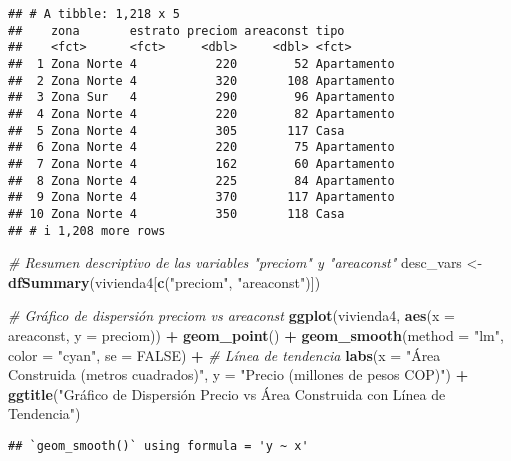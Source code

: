 \documentclass[
]{article}
\newenvironment{Shaded}{\begin{snugshade}}{\end{snugshade}}
\newcommand{\AttributeTok}[1]{\textcolor[rgb]{0.13,0.29,0.53}{#1}}
\newcommand{\CommentTok}[1]{\textcolor[rgb]{0.56,0.35,0.01}{\textit{#1}}}
\newcommand{\ConstantTok}[1]{\textcolor[rgb]{0.56,0.35,0.01}{#1}}
\newcommand{\FunctionTok}[1]{\textcolor[rgb]{0.13,0.29,0.53}{\textbf{#1}}}
\newcommand{\NormalTok}[1]{#1}
\newcommand{\OtherTok}[1]{\textcolor[rgb]{0.56,0.35,0.01}{#1}}
\newcommand{\SpecialCharTok}[1]{\textcolor[rgb]{0.81,0.36,0.00}{\textbf{#1}}}
\newcommand{\StringTok}[1]{\textcolor[rgb]{0.31,0.60,0.02}{#1}}
\begin{document}
\begin{verbatim}
## # A tibble: 1,218 x 5
##    zona       estrato preciom areaconst tipo       
##    <fct>      <fct>     <dbl>     <dbl> <fct>      
##  1 Zona Norte 4           220        52 Apartamento
##  2 Zona Norte 4           320       108 Apartamento
##  3 Zona Sur   4           290        96 Apartamento
##  4 Zona Norte 4           220        82 Apartamento
##  5 Zona Norte 4           305       117 Casa       
##  6 Zona Norte 4           220        75 Apartamento
##  7 Zona Norte 4           162        60 Apartamento
##  8 Zona Norte 4           225        84 Apartamento
##  9 Zona Norte 4           370       117 Apartamento
## 10 Zona Norte 4           350       118 Casa       
## # i 1,208 more rows
\end{verbatim}

\begin{Shaded}
\begin{Highlighting}[]
\CommentTok{\# Resumen descriptivo de las variables "preciom" y "areaconst"}
\NormalTok{desc\_vars }\OtherTok{\textless{}{-}} \FunctionTok{dfSummary}\NormalTok{(vivienda4[}\FunctionTok{c}\NormalTok{(}\StringTok{"preciom"}\NormalTok{, }\StringTok{"areaconst"}\NormalTok{)])}
\end{Highlighting}
\end{Shaded}

\begin{Shaded}
\begin{Highlighting}[]
\CommentTok{\# Gráfico de dispersión preciom vs areaconst}
\FunctionTok{ggplot}\NormalTok{(vivienda4, }\FunctionTok{aes}\NormalTok{(}\AttributeTok{x =}\NormalTok{ areaconst, }\AttributeTok{y =}\NormalTok{ preciom)) }\SpecialCharTok{+}
  \FunctionTok{geom\_point}\NormalTok{() }\SpecialCharTok{+}
  \FunctionTok{geom\_smooth}\NormalTok{(}\AttributeTok{method =} \StringTok{"lm"}\NormalTok{, }\AttributeTok{color =} \StringTok{"cyan"}\NormalTok{, }\AttributeTok{se =} \ConstantTok{FALSE}\NormalTok{) }\SpecialCharTok{+}  \CommentTok{\# Línea de tendencia}
  \FunctionTok{labs}\NormalTok{(}\AttributeTok{x =} \StringTok{"Área Construida (metros cuadrados)"}\NormalTok{, }\AttributeTok{y =} \StringTok{"Precio (millones de pesos COP)"}\NormalTok{) }\SpecialCharTok{+}
  \FunctionTok{ggtitle}\NormalTok{(}\StringTok{"Gráfico de Dispersión Precio vs Área Construida con Línea de Tendencia"}\NormalTok{)}
\end{Highlighting}
\end{Shaded}

\begin{verbatim}
## `geom_smooth()` using formula = 'y ~ x'
\end{verbatim}
\end{document}
